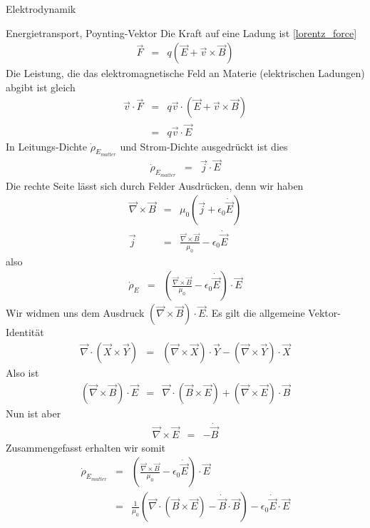 \begin{chapter}{\titlestr}
\begin{section}{Elektrodynamik}
\begin{subsubsection}{Energietransport, Poynting-Vektor}
Die Kraft auf eine Ladung ist \ref{lorentz_force}
\begin{eqnarray*}
\vec{F} &=& q\left(\vec{E}+\vec{v}\times\vec{B}\right)
\end{eqnarray*}
Die Leistung, die das elektromagnetische Feld an Materie (elektrischen Ladungen) abgibt ist gleich
\begin{eqnarray*}
\vec{v}\cdot\vec{F} &=& q\vec{v}\cdot\left(\vec{E}+\vec{v}\times\vec{B}\right)\\
&=&q\vec{v}\cdot\vec{E}
\end{eqnarray*}
In Leitungs-Dichte $\dot{\rho}_{E_{matter}}$ und Strom-Dichte ausgedrückt ist dies
\begin{eqnarray*}
\dot{\rho}_{E_{matter}}&=&\vec{j}\cdot\vec{E}
\end{eqnarray*}
Die rechte Seite lässt sich durch Felder Ausdrücken, denn wir haben
\begin{eqnarray*}
\vec{\nabla}\times\vec{B} &=& \mu_0\left(\vec{j}+\epsilon_0\dot{\vec{E}}\right)\\
\vec{j} &=& \frac{\vec{\nabla}\times\vec{B}}{\mu_0}-\epsilon_0\dot{\vec{E}}
\end{eqnarray*}
also
\begin{eqnarray*}
\dot{\rho}_E&=&\left(\frac{\vec{\nabla}\times\vec{B}}{\mu_0}-\epsilon_0\dot{\vec{E}}\right)\cdot\vec{E}
\end{eqnarray*}
Wir widmen uns dem Ausdruck $(\vec{\nabla}\times\vec{B})\cdot\vec{E}$. Es gilt die allgemeine Vektor-Identität
\begin{eqnarray*}
\vec{\nabla}\cdot\left(\vec{X}\times \vec{Y}\right)&=&(\vec{\nabla}\times\vec{X})\cdot\vec{Y}-(\vec{\nabla}\times\vec{Y})\cdot\vec{X}
\end{eqnarray*}
Also ist
\begin{eqnarray*}
(\vec{\nabla}\times\vec{B})\cdot\vec{E}&=&\vec{\nabla}\cdot\left(\vec{B}\times \vec{E}\right)+(\vec{\nabla}\times\vec{E})\cdot\vec{B}
\end{eqnarray*}
Nun ist aber
\begin{eqnarray*}
\vec{\nabla}\times\vec{E} &=& -\dot{\vec{B}}
\end{eqnarray*}
Zusammengefasst erhalten wir somit
\begin{eqnarray*}
\dot{\rho}_{E_{matter}}&=&\left(\frac{\vec{\nabla}\times\vec{B}}{\mu_0}-\epsilon_0\dot{\vec{E}}\right)\cdot\vec{E}\\
&=&\frac{1}{\mu_0}\left(\vec{\nabla}\cdot\left(\vec{B}\times \vec{E}\right)-\dot{\vec{B}}\cdot\vec{B}\right)-\epsilon_0\dot{\vec{E}}\cdot\vec{E}\\

\end{eqnarray*}
\end{subsubsection}
\end{section}
\end{chapter}

